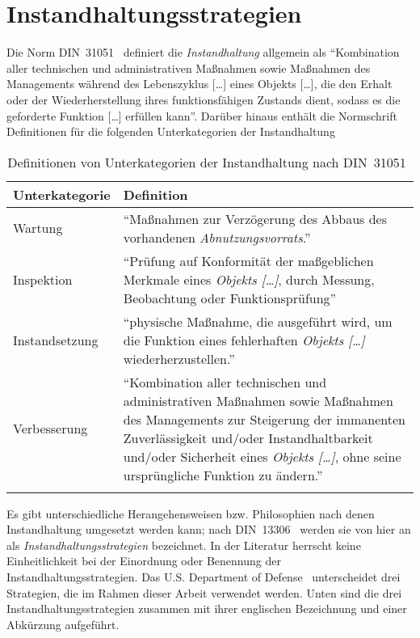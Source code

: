 \chapter{Instandhaltungsstrategien}
\label{ch:instandhaltungsstrategien}
Die Norm DIN~31051~\cite{DIN.2019} definiert die \textit{Instandhaltung} allgemein als \enquote{Kombination aller technischen und administrativen Maßnahmen sowie Maßnahmen des Managements während des Lebenszyklus [\dots] eines Objekts [\dots], die den Erhalt oder der Wiederherstellung ihres funktionsfähigen Zustands dient, sodass es die geforderte Funktion [\dots] erfüllen kann}. Darüber hinaus enthält die Normschrift Definitionen für die folgenden Unterkategorien der Instandhaltung

\begin{table}[ht]
	\centering
    \begin{tabularx}{\textwidth}{ | l | X |}
        \hline
        \rowcolor{lightgray}
        Unterkategorie & Definition\\
        \hline
        Wartung & \enquote{Maßnahmen zur Verzögerung des Abbaus des vorhandenen \textit{Abnutzungsvorrats}.}\\
        \hline
        Inspektion & \enquote{Prüfung auf Konformität der maßgeblichen Merkmale eines \textit{Objekts […]}, durch Messung, Beobachtung oder Funktionsprüfung}\\
        \hline
        Instandsetzung & \enquote{physische Maßnahme, die ausgeführt wird, um die Funktion eines fehlerhaften \textit{Objekts […] }wiederherzustellen.}\\
        \hline
        Verbesserung & \enquote{Kombination aller technischen und administrativen Maßnahmen sowie Maßnahmen des Managements zur Steigerung der immanenten Zuverlässigkeit und/oder Instandhaltbarkeit und/oder Sicherheit eines \textit{Objekts […]}, ohne seine ursprüngliche Funktion zu ändern.}\\
        \hline
        \caption{Definitionen von Unterkategorien der Instandhaltung nach DIN~{31051}~\cite{DIN.2019}}%
        \label{tab:definition_unterkategorien_instandhaltung}	%
    \end{tabularx}
\end{table}

Es gibt unterschiedliche Herangehensweisen bzw. Philosophien nach denen Instandhaltung umgesetzt werden kann; nach DIN~13306~\cite{DIN.2018} werden sie von hier an als \textit{Instandhaltungsstrategien} bezeichnet. In der Literatur herrscht keine Einheitlichkeit bei der Einordnung oder Benennung der Instandhaltungsstrategien. Das U.S. Department of Defense~\cite[S.~16]{U.S.DepartmentofDefense.2008} unterscheidet drei Strategien, die im Rahmen dieser Arbeit verwendet werden. Unten sind die drei Instandhaltungsstrategien zusammen mit ihrer englischen Bezeichnung und einer Abkürzung aufgeführt.

